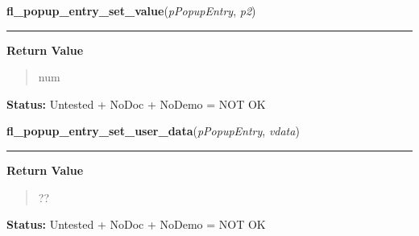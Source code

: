     \vspace{0.5ex}

\hspace{.8\funcindent}\begin{boxedminipage}{\funcwidth}

    \raggedright \textbf{fl\_popup\_entry\_set\_value}(\textit{pPopupEntry}, \textit{p2})

    \vspace{-1.5ex}

    \rule{\textwidth}{0.5\fboxrule}
\setlength{\parskip}{2ex}
\setlength{\parskip}{1ex}
      \textbf{Return Value}
    \vspace{-1ex}

      \begin{quote}
      num

      \end{quote}

\textbf{Status:} Untested + NoDoc + NoDemo = NOT OK



    \end{boxedminipage}

    \label{xformslib:library:fl_popup_entry_set_user_data}

    \vspace{0.5ex}

\hspace{.8\funcindent}\begin{boxedminipage}{\funcwidth}

    \raggedright \textbf{fl\_popup\_entry\_set\_user\_data}(\textit{pPopupEntry}, \textit{vdata})

    \vspace{-1.5ex}

    \rule{\textwidth}{0.5\fboxrule}
\setlength{\parskip}{2ex}
\setlength{\parskip}{1ex}
      \textbf{Return Value}
    \vspace{-1ex}

      \begin{quote}
      ??

      \end{quote}

\textbf{Status:} Untested + NoDoc + NoDemo = NOT OK



    \end{boxedminipage}

